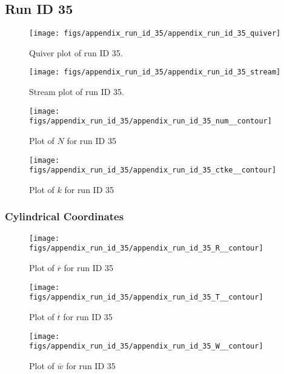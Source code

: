 \subsection{Run ID 35}
\begin{figure}[H]
\centering
\texttt{[image: figs/appendix\_run\_id\_35/appendix\_run\_id\_35\_quiver]}
\caption{Quiver plot of run ID 35.}
\label{fig:appendix_run_id_35_quiver}
\end{figure}


\begin{figure}[H]
\centering
\texttt{[image: figs/appendix\_run\_id\_35/appendix\_run\_id\_35\_stream]}
\caption{Stream plot of run ID 35.}
\label{fig:appendix_run_id_35_stream}
\end{figure}


\begin{figure}[H]
\centering
\texttt{[image: figs/appendix\_run\_id\_35/appendix\_run\_id\_35\_num\_\_contour]}
\caption{Plot of $N$ for run ID 35}
\label{fig:appendix_run_id_35_num__contour}
\end{figure}


\begin{figure}[H]
\centering
\texttt{[image: figs/appendix\_run\_id\_35/appendix\_run\_id\_35\_ctke\_\_contour]}
\caption{Plot of $k$ for run ID 35}
\label{fig:appendix_run_id_35_ctke__contour}
\end{figure}


\subsubsection{Cylindrical Coordinates}
\begin{figure}[H]
\centering
\texttt{[image: figs/appendix\_run\_id\_35/appendix\_run\_id\_35\_R\_\_contour]}
\caption{Plot of $\overline{r}$ for run ID 35}
\label{fig:appendix_run_id_35_R__contour}
\end{figure}


\begin{figure}[H]
\centering
\texttt{[image: figs/appendix\_run\_id\_35/appendix\_run\_id\_35\_T\_\_contour]}
\caption{Plot of $\overline{t}$ for run ID 35}
\label{fig:appendix_run_id_35_T__contour}
\end{figure}


\begin{figure}[H]
\centering
\texttt{[image: figs/appendix\_run\_id\_35/appendix\_run\_id\_35\_W\_\_contour]}
\caption{Plot of $\overline{w}$ for run ID 35}
\label{fig:appendix_run_id_35_W__contour}
\end{figure}


